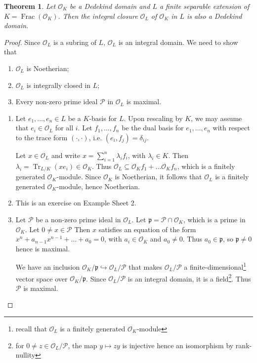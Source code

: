 \documentclass[11pt]{article}
\theoremstyle{definition}
\theoremstyle{plain}
\newtheorem{theorem}[definition]{Theorem}
\theoremstyle{remark}
\DeclareMathOperator{\Frac}{Frac}
\DeclareMathOperator{\Tr}{Tr}
\newcommand{\cO}{\mathcal{O}}
\newcommand{\cP}{\mathcal{P}}
\newcommand{\fp}{\mathfrak{p}}
\begin{document}
\begin{theorem}\label{thm:10_2}
    Let $\cO_K$ be a Dedekind domain and $L$ a finite separable extension of $K = \Frac(\cO_K)$. Then the integral closure $\cO_L$ of $\cO_K$ in $L$ is also a Dedekind domain.
\end{theorem}
\begin{proof}
    Since $\cO_L$ is a subring of $L$, $\cO_L$ is an integral domain. We need to show that
    \begin{enumerate}
        \item $\cO_L$ is Noetherian;
        \item $\cO_L$ is integrally closed in $L$;
        \item Every non-zero prime ideal $\cP$ in $\cO_L$ is maximal.
    \end{enumerate}

    \begin{enumerate}
        \item Let $e_1, \ldots, e_n \in L$ be a $K$-basis for $L$. Upon rescaling by $K$, we may assume that $e_i \in \cO_L$ for all $i$. Let $f_1, \ldots, f_n$ be the dual basis for $e_1, \ldots, e_n$ with respect to the trace form $(\cdot, \cdot)$, i.e. $(e_i, f_j) = \delta_{ij}$.

            Let $x \in \cO_L$ and write $x = \sum_{i=1}^n \lambda_i f_i$, with $\lambda_i \in K$. Then $\lambda_i = \Tr_{L/K}(x e_i) \in \cO_K$. Thus $\cO_L \subseteq \cO_K f_1 + \ldots \cO_K f_n$, which is a finitely generated $\cO_K$-module. Since $\cO_K$ is Noetherian, it follows that $\cO_L$ is a finitely generated $\cO_K$-module, hence Noetherian.

        \item This is an exercise on Example Sheet 2.

        \item Let $\cP$ be a non-zero prime ideal in $\cO_L$. Let $\fp = \cP \cap \cO_K$, which is a prime in $\cO_K$. Let $0 \neq x \in \cP$ Then $x$ satisfies an equation of the form $x^n + a_{n-1}x^{n-1} + \ldots + a_0 = 0$, with $a_i \in \cO_K$ and $a_0 \neq 0$. Thus $a_0 \in \fp$, so $\fp \neq 0$ hence is maximal.

            We have an inclusion $\cO_K / \fp \hookrightarrow \cO_L / \cP$ that makes $\cO_L / \cP$ a finite-dimensional\footnote{recall that $\cO_L$ is a finitely generated $\cO_K$-module} vector space over $\cO_K / \fp$. Since $\cO_L / \cP$ is an integral domain, it is a field\footnote{for $0 \neq z \in \cO_L / \cP$, the map $y \mapsto z y$ is injective hence an isomorphism by rank-nullity}. Thus $\cP$ is maximal. \qedhere
    \end{enumerate}
\end{proof}
\end{document}
